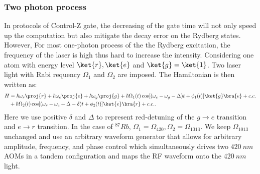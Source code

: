 \documentclass[11pt]{article}
\begin{document}
 \subsubsection{Two photon process}
In protocols of Control-Z gate, the decreasing of the gate time will not only speed up the computation but also mitigate the decay error on the Rydberg states. 
However, For most one-photon process of the the Rydberg excitation, the frequency of the laser is high thus hard to increase the intensity. 
Considering one atom with energy level $\ket{r}, \ket{e}$ and $\ket{g} = \ket{1}$. Two laser light with Rabi requency $\Omega_1$ and $\Omega_2$ are imposed. The Hamiltonian is then written as:
\begin{align}
    H &= \hbar \omega_r \proj{r} + \hbar \omega_e \proj{e} +\hbar \omega_g \proj{g}  + \hbar \Omega_1(t) \cos[(\omega_e - \omega_g -\Delta)t + \phi_1(t)]\ket{g}\bra{e} + c.c. \\
    &+\hbar \Omega_2(t) \cos[(\omega_r - \omega_e +\Delta -\delta)t + \phi_2(t)]\ket{e}\bra{r} + c.c..
    \label{eq:two_photon_H}
\end{align}
Here we use positive $\delta$ and $\Delta$ to represent red-detuning of the $g \to e$ transition and $e \to r$ transition. In the case of $^{87}Rb$, $\Omega_1 =\Omega_{420}, \Omega_2= \Omega_{1013}$. We keep $\Omega_{1013}$ unchanged and use an arbitrary waveform generator that allows for arbitrary amplitude, frequency, and phase control which simultaneously drives two $420~nm$ AOMs in a tandem configuration and maps the RF waveform onto the $420~nm$ light\cite{Evered_2023}.
\end{document}
